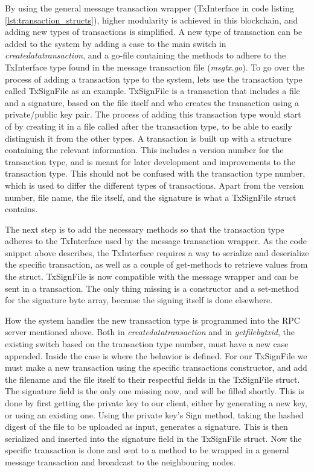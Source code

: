 \documentclass[11pt]{article}
\begin{document}
By using the general message transaction wrapper (TxInterface in code listing \ref{lst:transaction_structs}), higher modularity is achieved in this blockchain, and adding new types of transactions is simplified. A new type of transaction can be added to the system by adding a case to the main switch in  {\it{createdatatransaction}}, and a go-file containing the methods to adhere to the TxInterface type found in the message transaction file ({\it{msgtx.go}}). To go over the process of adding a transaction type to the system, lets use the transaction type called TxSignFile as an example. TxSignFile is a transaction that includes a file and a signature, based on the file itself and who creates the transaction using a private/public key pair. The process of adding this transaction type would start of by creating it in a file called after the transaction type, to be able to easily distinguish it from the other types. A transaction is built up with a structure containing the relevant information. This includes a version number for the transaction type, and is meant for later development and improvements to the transaction type. This should not be confused with the transaction type number, which is used to differ the different types of transactions. Apart from the version number, file name, the file itself, and the signature is what a TxSignFile struct contains.

The next step is to add the necessary methods so that the transaction type adheres to the TxInterface used by the message transaction wrapper. As the code snippet above describes, the TxInterface requires a way to serialize and deserialize the specific transaction, as well as a couple of get-methods to retrieve values from the struct. TxSignFile is now compatible with the message wrapper and can be sent in a transaction. The only thing missing is a constructor and a set-method for the signature byte array, because the signing itself is done elsewhere. 

How the system handles the new transaction type is programmed into the RPC server mentioned above. Both in \textit{createdatatransaction} and in \textit{getfilebytxid}, the existing switch based on the transaction type number, must have a new case appended. Inside the case is where the behavior is defined. For our TxSignFile we must make a new transaction using the specific transactions constructor, and add the filename and the file itself to their respectful fields in the TxSignFile struct. The signature field is the only one missing now, and will be filled shortly. This is done by first getting the private key to our client, either by generating a new key, or using an existing one. Using the private key's Sign method, taking the hashed digest of the file to be uploaded as input, generates a signature. This is then serialized and inserted into the signature field in the TxSignFile struct. Now the specific transaction is done and sent to a method to be wrapped in a general message transaction and broadcast to the neighbouring nodes. 
\end{document}
